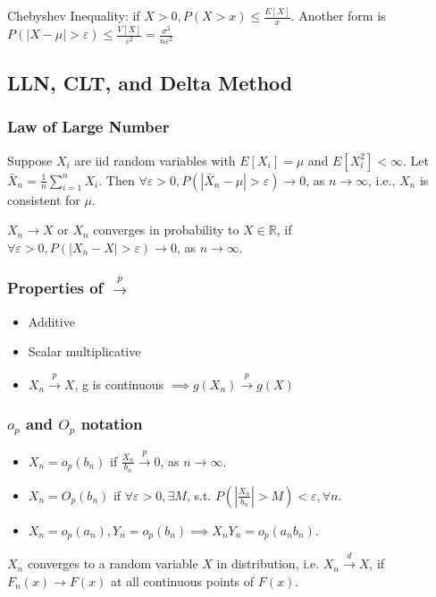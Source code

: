 \documentclass[11pt, a4paper, oneside]{article}
\theoremstyle{definition}
\theoremstyle{proposition}
\theoremstyle{corollary}
\theoremstyle{lemma}
\theoremstyle{theorem}
\begin{document}
Chebyshev Inequality: if $X>0, P(X>x) \leq \frac{E[X]}{x}$. Another form is $P(|X-\mu| > \varepsilon) \leq \frac{V[X]}{\varepsilon^2}=\frac{\sigma^2}{n\varepsilon^2}$

\subsection{LLN, CLT, and Delta Method}

\subsubsection*{Law of Large Number}
Suppose $X_i$ are iid random variables with $E[X_i] = \mu$ and $E[X_i^2] < \infty$. Let $\bar{X}_n = \frac{1}{n}\sum_{i=1}^n X_i$. Then $\forall \varepsilon > 0, P(|\bar{X}_n - \mu| > \varepsilon) \to 0$, as $n \to \infty$, i.e., $X_n$ is consistent for $\mu$. 

$X_n \to X$ or $X_n$ converges in probability to $X\in \mathbb{R}$, if $\forall \varepsilon > 0, P(|X_n-X|> \varepsilon) \to 0$, as $n \to \infty$. 

\subsubsection*{Properties of $\overset{p}{\to}$}
\begin{itemize}
\item Additive
\item Scalar multiplicative
\item $X_n \overset{p}{\to} X$, g is continuous $\implies g(X_n) \overset{p}{\to} g(X)$ 
\end{itemize}

\subsubsection{$o_p$ and $O_p$ notation}
\begin{itemize}
\item $X_n = o_p(b_n)$ if $\frac{X_n}{b_n}\overset{p}{\to} 0$, as $n \to \infty$. 
\item $X_n = O_p(b_n)$ if $\forall \varepsilon > 0, \exists M$, s.t. $P(|\frac{X_n}{b_n}| > M) < \varepsilon, \forall n$. 
\item $X_n = o_p(a_n), Y_n = o_p(b_n) \implies X_nY_n = o_p(a_nb_n)$. 
\end{itemize}

$X_n$ converges to a random variable $X$ in distribution, i.e. $X_n \overset{d}{\to} X$, if $F_n(x) \to F(x)$ at all continuous points of $F(x)$. 
\end{document}
